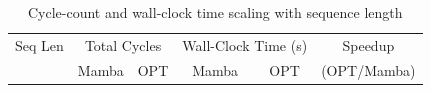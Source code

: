 \begin{table}[h]\centering
    \caption{Cycle-count and wall-clock time scaling with sequence length}
    \label{tab:seq_scaling}
    \begin{tabular}{r cc cc c}\hline
        Seq Len & \multicolumn{2}{c}{Total Cycles} & \multicolumn{2}{c}{Wall-Clock Time (s)} & Speedup \\
            & Mamba & OPT & Mamba & OPT & (OPT/Mamba) \\\hline
\hline\end{tabular}\end{table}